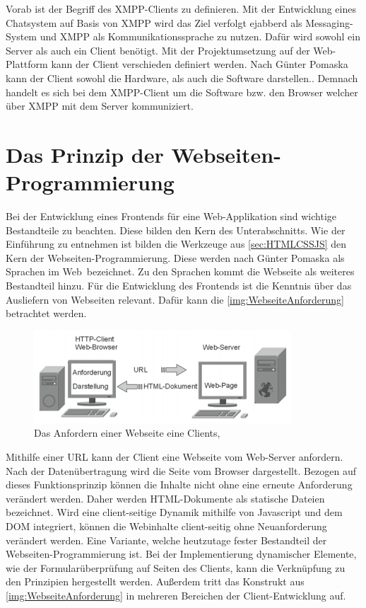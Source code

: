 \documentclass[a4paper,titlepage,halfparskip,12pt]{scrreprt}
\begin{document}
\begin{onehalfspacing}
Vorab ist der Begriff des XMPP-Clients zu definieren. Mit der Entwicklung eines Chatsystem auf Basis von XMPP wird das Ziel verfolgt ejabberd als Messaging-System und XMPP als Kommunikationssprache zu nutzen. Dafür wird sowohl ein Server als auch ein Client benötigt. Mit der Projektumsetzung auf der Web-Plattform kann der Client verschieden definiert werden. Nach Günter Pomaska kann der Client sowohl die Hardware, als auch die Software darstellen.\cite{pomaska2012webseiten}. Demnach handelt es sich bei dem XMPP-Client um die Software bzw. den Browser welcher über XMPP mit dem Server kommuniziert.

\section{Das Prinzip der Webseiten-Programmierung}
\label{WebsiteProgramming}
Bei der Entwicklung eines Frontends für eine Web-Applikation sind wichtige Bestandteile zu beachten. Diese bilden den Kern des Unterabschnitts. Wie der Einführung zu entnehmen ist bilden die Werkzeuge aus \autoref{sec:HTMLCSSJS} den Kern der Webseiten-Programmierung. Diese werden nach Günter Pomaska als \glqq Sprachen im Web\grqq\ bezeichnet. Zu den Sprachen kommt die Webseite als weiteres Bestandteil hinzu. Für die Entwicklung des Frontends ist die Kenntnis über das Ausliefern von Webseiten relevant. Dafür kann die \autoref{img:WebseiteAnforderung} betrachtet werden.
\begin{figure}[h]
	\centering
	\includegraphics[scale=2.1]{images/WebseiteAnfordern}
	\caption{Das Anfordern einer Webseite eine Clients, \cite{pomaska2012webseiten}}
	\label{img:WebseiteAnforderung}
\end{figure}
Mithilfe einer URL kann der Client eine Webseite vom Web-Server anfordern. Nach der Datenübertragung wird die Seite vom Browser dargestellt. Bezogen auf dieses Funktionsprinzip können die Inhalte nicht ohne eine erneute Anforderung verändert werden. Daher werden HTML-Dokumente als statische Dateien bezeichnet. Wird eine client-seitige Dynamik mithilfe von Javascript und dem \ac{DOM} integriert, können die Webinhalte client-seitig ohne Neuanforderung verändert werden. Eine Variante, welche heutzutage fester Bestandteil der Webseiten-Programmierung ist. \cite{pomaska2012webseiten}
Bei der Implementierung dynamischer Elemente, wie der Formularüberprüfung auf Seiten des Clients, kann die Verknüpfung zu den Prinzipien hergestellt werden. Außerdem tritt das Konstrukt aus \autoref{img:WebseiteAnforderung} in mehreren Bereichen der Client-Entwicklung auf.


\end{onehalfspacing}
\end{document}
